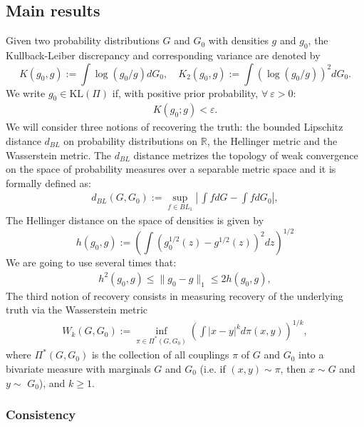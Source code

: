 \subsection{Main results}\label{III.sec: main results}


Given two probability distributions $G$ and $G_0$ with densities $g$ and $g_0$, the Kullback-Leiber discrepancy and corresponding variance are denoted by
$$
K\left(g_0, g\right) :=\int \log \left(g_0 / g\right) d G_0, \quad K_2\left(g_0, g\right) :=\int\left(\log \left(g_0 / g\right)\right)^2 d G_0.
$$
We write $g_0 \in \mathrm{KL}(\Pi)$ if, with positive prior probability, $\forall \: \varepsilon >0$:
\begin{align*}
    K(g_0;g) < \varepsilon.
\end{align*}
We will consider three notions of recovering the truth: the bounded Lipschitz distance $d_{\scriptscriptstyle{BL}}$ on probability distributions on $\mathbb{R}$, the Hellinger metric and the Wasserstein metric. The $d_{\scriptscriptstyle{BL}}$ distance metrizes the topology of weak convergence on the space of probability measures over a separable metric space and it is formally defined as:
\begin{align}\label{III.eq: formal definition conditional convergence}
    d_{\scriptscriptstyle{ B L}}\left(G, G_0\right):=\sup _{f \in B L_1}\left| \,\int f d G -\int f d G_0\right| ,
\end{align}
The Hellinger distance on the space of densities is given by
$$
h(g_0, g):=\left(\int\left(g_0^{1 / 2}(z)-g^{1 / 2}(z)\right)^2 d z\right)^{1 / 2}
$$
We are going to use several times that:
\begin{align}\label{III.eq: bound hellinger with L1}
h^2(g_0, g) \leq\|g_0-g\|_1 \leq 2 h(g_0, g),     
\end{align} 
The third notion of recovery consists in measuring recovery of the underlying truth via the Wasserstein metric
\begin{align*}
W_k \left( G, G_0 \right) := \inf_{\pi \in \Pi^* \left(G, G_0\right)}\left(\int |x-y|^k d \pi(x, y)\right)^{1 / k},  
\end{align*}
where $\Pi^*\left(G, G_0\right)$ is the collection of all couplings $\pi$ of $G$ and $G_0$ into a bivariate measure with marginals $G$ and $G_0$ (i.e. if $(x, y) \sim \pi$, then $x \sim G$ and $y \sim$ $G_0$), and $k \geq 1$.

\subsubsection{Consistency}\label{III.sec: consistency}


